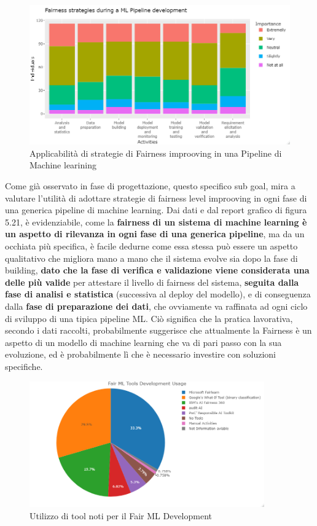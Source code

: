      \begin{figure}[h!]
        \centering
        \includegraphics[width=1\textwidth]{figure/Analisi/RQ4/Fairness strategies during a ML Pipeline development.png}
        \caption{Applicabilità di strategie di Fairness improoving in una Pipeline di Machine learining}
    \end{figure}
    Come già osservato in fase di progettazione, questo specifico sub goal, mira a valutare l'utilità di adottare strategie di fairness level improoving in ogni fase di una generica pipeline di machine learning. Dai dati e dal report grafico di figura 5.21, è  evidenziabile, come la \textbf{fairness di un sistema di machine learning è un aspetto di rilevanza in ogni fase di una generica pipeline}, ma da un occhiata più specifica, è facile dedurne come essa stessa può essere un aspetto qualitativo che migliora mano a mano che il sistema evolve sia dopo la fase di building, \textbf{dato che la fase di verifica e validazione viene considerata una delle più valide} per attestare il livello di fairness del sistema, \textbf{seguita dalla fase di analisi e statistica} (successiva al deploy del modello), e di conseguenza dalla \textbf{fase di preparazione dei dati}, che ovviamente va raffinata ad ogni ciclo di sviluppo di una tipica pipeline ML. Ciò significa che la pratica lavorativa, secondo i dati raccolti, probabilmente suggerisce che attualmente la Fairness è un aspetto di un modello di machine learning che va di pari passo con la sua evoluzione, ed è probabilmente lì che è necessario investire con soluzioni specifiche.
    
    \begin{figure}[h!]
        \centering
        \includegraphics[width=0.9\textwidth]{figure/Analisi/RQ4/Fair ML Tools Development Usage.png}
        \caption{Utilizzo di tool noti per il Fair ML Development}
    \end{figure}
    
